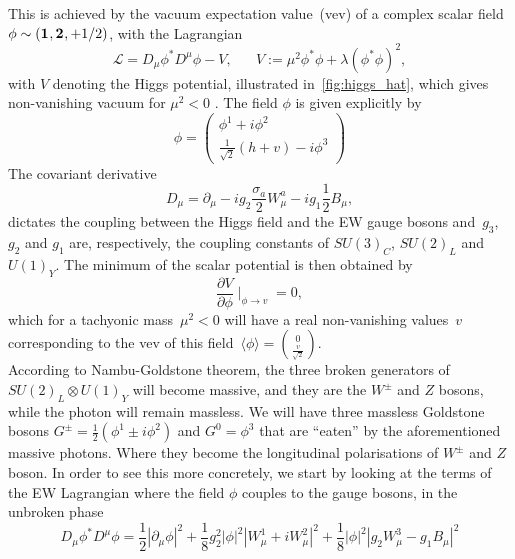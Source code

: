 This is  achieved by the vacuum expectation value~(vev) of a complex scalar field $\phi\sim (\irrep{1},\irrep{2},+1/2)$, with the Lagrangian 
\begin{equation}
    \mathcal{L} = D_\mu \phi^* D^\mu \phi -V,\;\;\;\;\;\; V:= \mu^2  \phi^* \phi +\lambda (\phi^* \phi)^2,
    \label{higgspot}
\end{equation}
 with $V$ denoting the Higgs potential, illustrated in~\autoref{fig:higgs_hat}, which gives non-vanishing vacuum for $ \mu^2 <0$ . The field $\phi$ is given explicitly by 
 \begin{equation}
  \phi = \begin{pmatrix}
      \phi^1 + i \phi^2\\  \frac{1}{\sqrt{2}}(h+v)-i \phi^3
  \end{pmatrix}
\end{equation}
The covariant derivative 
\begin{equation}
    D_\mu= \partial_\mu -ig_2\frac{\sigma_a}{2}W^a_\mu-ig_1\frac{1}{2} B_\mu,   
\end{equation}
dictates the coupling between the Higgs field and the EW gauge bosons and~$g_3$, $g_2$ and $g_1$ are, respectively, the coupling constants of 
${ SU(3)_C}$,  ${ SU(2)_L}$ and  ${ U(1)_Y}$.  
 The minimum of the scalar potential is then obtained by
 \begin{equation}
\frac{\partial V}{\partial \phi} \mid_{\phi\to v} = 0,
\end{equation}
which for a tachyonic mass~$\mu^2 < 0$ will have a real non-vanishing values~$v$ corresponding to the vev of this field~$\langle \phi \rangle ={0\choose \frac{v}{\sqrt{2}}}$.\\
According to Nambu-Goldstone theorem, the three broken generators of~$SU(2)_L \otimes U(1)_Y$ will become massive, and they are the $W^\pm$ and $Z$ bosons, while the photon will remain massless. We will have three massless Goldstone bosons $ G^\pm=\frac{1}{2} (\phi^1\pm i\phi^2) $ and $G^0=\phi^3$ that are ``eaten'' by the aforementioned massive photons. Where they become the longitudinal polarisations of $W^\pm$ and $Z$ boson. In order to see this more concretely, we start by looking at the terms of the EW Lagrangian where the field $\phi$ couples to the gauge bosons, in the unbroken phase
\begin{equation}
   D_\mu \phi^* D^\mu \phi = \frac{1}{2} |\partial_\mu \phi|^2 + \frac{1}{8}g_2^2|\phi|^2|W_\mu^1+iW_\mu^2|^2
   + \frac{1}{8}|\phi|^2 |g_2 W_\mu^3- g_1 B_\mu|^2
   \label{ewhiggs_ub}
\end{equation}
